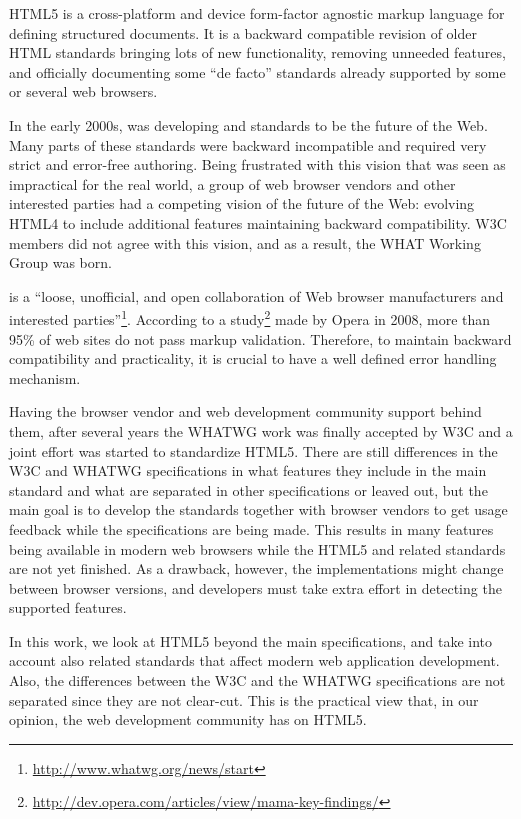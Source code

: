 HTML5 is a cross-platform and device form-factor agnostic markup
language for defining structured documents. It is a backward
compatible revision of older HTML standards bringing lots of new
functionality, removing unneeded features, and officially documenting
some ``de facto'' standards already supported by some or several web
browsers. \cite{pilgrim2010html5}

In the early 2000s,  was developing  and
 standards to be the future of the Web. Many parts of
these standards were backward incompatible and required very strict
and error-free authoring. Being frustrated with this vision that was
seen as impractical for the real world, a group of web browser vendors
and other interested parties had a competing vision of the future of
the Web: evolving HTML4 to include additional features maintaining
backward compatibility. W3C members did not agree with this vision,
and as a result, the WHAT Working Group was
born. \cite{pilgrim2010html5}

 is a ``loose, unofficial, and open collaboration of Web
browser manufacturers and interested
parties''\footnote{\url{http://www.whatwg.org/news/start}}. According
to a
study\footnote{\url{http://dev.opera.com/articles/view/mama-key-findings/}}
made by Opera in 2008, more than 95\% of web sites do not pass markup
validation. Therefore, to maintain backward compatibility and
practicality, it is crucial to have a well defined error handling
mechanism.

Having the browser vendor and web development community support behind
them, after several years the WHATWG work was finally accepted by W3C
and a joint effort was started to standardize HTML5. There are still
differences in the W3C and WHATWG specifications in what features they
include in the main standard and what are separated in other
specifications or leaved out, but the main goal is to develop the
standards together with browser vendors to get usage feedback while
the specifications are being made. This results in many features being
available in modern web browsers while the HTML5 and related standards
are not yet finished. As a drawback, however, the implementations
might change between browser versions, and developers must take extra
effort in detecting the supported features. \cite{pilgrim2010html5}

In this work, we look at HTML5 beyond the main specifications, and
take into account also related standards that affect modern web
application development. Also, the differences between the W3C and the
WHATWG specifications are not separated since they are not
clear-cut. This is the practical view that, in our opinion, the web
development community has on HTML5.

